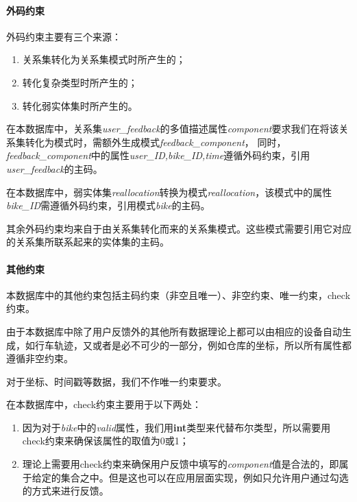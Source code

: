 \paragraph{外码约束}
外码约束主要有三个来源：
\begin{enumerate}
    \item 关系集转化为关系集模式时所产生的；
    \item 转化复杂类型时所产生的；
    \item 转化弱实体集时所产生的。
\end{enumerate}

在本数据库中，关系集\textit{user\_feedback}的多值描述属性\textit{component}要求我们在将该关系集转化为模式时，需额外生成模式\textit{feedback\_component}，
同时，\textit{feedback\_component}中的属性\textit{user\_ID,bike\_ID,time}遵循外码约束，引用\textit{user\_feedback}的主码。

在本数据库中，弱实体集\textit{reallocation}转换为模式\textit{reallocation}，该模式中的属性\textit{bike\_ID}需遵循外码约束，引用模式\textit{bike}的主码。

其余外码约束均来自于由关系集转化而来的关系集模式。这些模式需要引用它对应的关系集所联系起来的实体集的主码。%

\paragraph{其他约束}
本数据库中的其他约束包括主码约束（非空且唯一）、非空约束、唯一约束，check约束。

由于本数据库中除了用户反馈外的其他所有数据理论上都可以由相应的设备自动生成，如行车轨迹，又或者是必不可少的一部分，例如仓库的坐标，所以所有属性都遵循非空约束。

对于坐标、时间戳等数据，我们不作唯一约束要求。

在本数据库中，check约束主要用于以下两处：
\begin{enumerate}
    \item 因为对于\textit{bike}中的\textit{valid}属性，我们用\textbf{int}类型来代替布尔类型，所以需要用check约束来确保该属性的取值为0或1；
    \item 理论上需要用check约束来确保用户反馈中填写的\textit{component}值是合法的，即属于给定的集合之中。但是这也可以在应用层面实现，例如只允许用户通过勾选的方式来进行反馈。
\end{enumerate}

